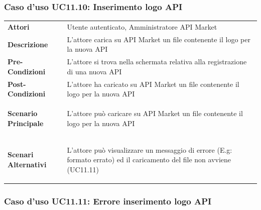 \subsubsection{Caso d'uso UC11.10: Inserimento logo API}
\label{UC11_10}

\begin{minipage}{\linewidth}
	\begin{tabular}{ l | p{11cm}}
		\hline
		\rowcolor{Gray}
		\multicolumn{2}{c}{UC11.10 - Inserimento logo API} \\
		\hline
		\textbf{Attori} & Utente autenticato, Amministratore API Market \\
		\textbf{Descrizione} & L'attore carica su API Market un file contenente il logo per la nuova API \\
		\textbf{Pre-Condizioni} & L'attore si trova nella schermata relativa alla registrazione di una nuova API \\
		\textbf{Post-Condizioni} & L'attore ha caricato su API Market un file contenente il logo per la nuova API \\
		\textbf{Scenario Principale} & 
		\begin{enumerate*}[label=(\arabic*.),itemjoin={\newline}]
			\item L'attore può caricare su API Market un file contenente il logo per la nuova API
		\end{enumerate*}\\
		\textbf{Scenari Alternativi} & 
		\begin{enumerate*}[label=(\arabic*.),itemjoin={\newline}]
		\item L'attore può visualizzare un messaggio di errore (E.g: formato errato) ed il caricamento del file non avviene (UC11.11)
		\end{enumerate*}\\
	\end{tabular}
\end{minipage}

\subsubsection{Caso d'uso UC11.11: Errore inserimento logo API}
\label{UC11_11}

